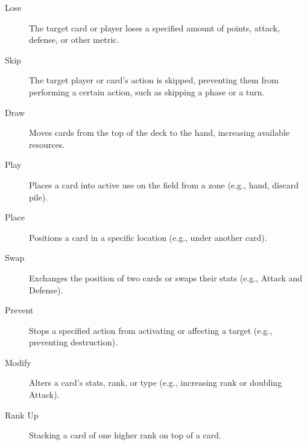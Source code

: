 \begin{description}
	\item[Lose] The target card or player loses a specified amount of points, attack, defense, or other metric.  
	\item[Skip] The target player or card’s action is skipped, preventing them from performing a certain action, such as skipping a phase or a turn.
	\item[Draw] Moves cards from the top of the deck to the hand, increasing available resources.
	\item[Play] Places a card into active use on the field from a zone (e.g., hand, discard pile).
	\item[Place] Positions a card in a specific location (e.g., under another card).
	\item[Swap] Exchanges the position of two cards or swaps their stats (e.g., Attack and Defense).
	\item[Prevent] Stops a specified action from activating or affecting a target (e.g., preventing destruction).
	\item[Modify] Alters a card’s stats, rank, or type (e.g., increasing rank or doubling Attack).
	\item[Rank Up] Stacking a card of one higher rank on top of a card.
\end{description}























